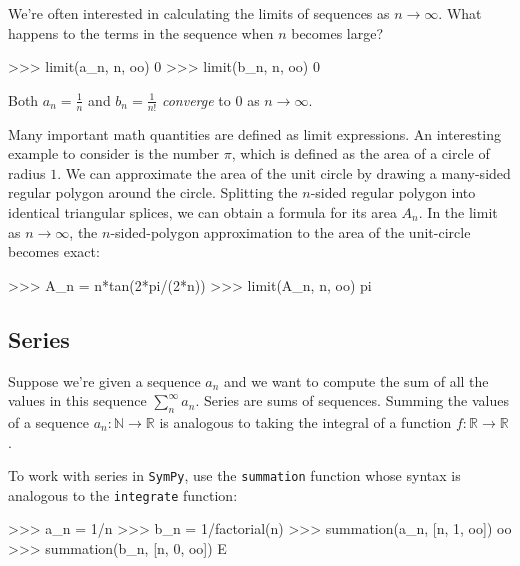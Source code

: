 We're often interested in calculating the limits of sequences as $n\to \infty$.
What happens to the terms in the sequence when $n$ becomes large?

\small
\begin{verbatimtab}
>>> limit(a_n, n, oo)
0
>>> limit(b_n, n, oo)
0
\end{verbatimtab}
\normalsize

\noindent
Both $a_n=\frac{1}{n}$ and $b_n = \frac{1}{n!}$ \emph{converge} to $0$ as $n\to\infty$.							

\medskip

Many important math quantities are defined as limit expressions.
An interesting example to consider is the number $\pi$,
which is defined as the area of a circle of radius $1$.	
We can approximate the area of the unit circle by drawing a many-sided regular polygon around the circle.
Splitting the $n$-sided regular polygon into identical triangular splices,
we can obtain a formula for its area $A_n$.
In the limit as $n\to \infty$, 
the $n$-sided-polygon approximation to the area of the unit-circle becomes exact:		

\small
\begin{verbatimtab}
>>> A_n = n*tan(2*pi/(2*n))
>>> limit(A_n, n, oo)
pi
\end{verbatimtab}
\normalsize


\subsection{Series}
\label{calculus:series}

Suppose we're given a sequence $a_n$ and we want to compute the sum of all the values in this sequence $\sum_{n}^\infty a_n$.
Series are sums of sequences.																		
Summing the values of a sequence $a_n:\mathbb{N}\to \mathbb{R}$
is analogous to taking the integral of a function $f:\mathbb{R}\to \mathbb{R}$.

To work with series in \texttt{SymPy},
use the \texttt{summation} function whose syntax is analogous to the \texttt{integrate} function: 						

\small
\begin{verbatimtab}
>>> a_n = 1/n
>>> b_n = 1/factorial(n)
>>> summation(a_n, [n, 1, oo])
oo
>>> summation(b_n, [n, 0, oo])
E
\end{verbatimtab}
\normalsize

